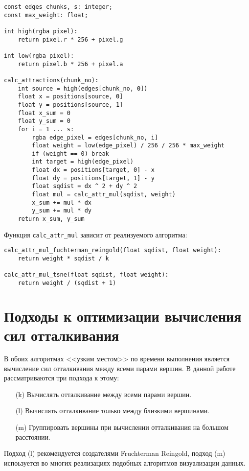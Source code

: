 \begin{verbatim}
const edges_chunks, s: integer;
const max_weight: float;

int high(rgba pixel):
    return pixel.r * 256 + pixel.g

int low(rgba pixel):
    return pixel.b * 256 + pixel.a

calc_attractions(chunk_no):
    int source = high(edges[chunk_no, 0])
    float x = positions[source, 0]
    float y = positions[source, 1]
    float x_sum = 0
    float y_sum = 0
    for i = 1 ... s:
        rgba edge_pixel = edges[chunk_no, i]
        float weight = low(edge_pixel) / 256 / 256 * max_weight
        if (weight == 0) break
        int target = high(edge_pixel)
        float dx = positions[target, 0] - x
        float dy = positions[target, 1] - y
        float sqdist = dx ^ 2 + dy ^ 2
        float mul = calc_attr_mul(sqdist, weight)
        x_sum += mul * dx
        y_sum += mul * dy
    return x_sum, y_sum
\end{verbatim}

Функция \texttt{calc\_attr\_mul} зависит от реализуемого алгоритма:

\begin{verbatim}
calc_attr_mul_fuchterman_reingold(float sqdist, float weight):
    return weight * sqdist / k

calc_attr_mul_tsne(float sqdist, float weight):
    return weight / (sqdist + 1)
\end{verbatim}

\section{Подходы к оптимизации вычисления сил отталкивания}


В обоих алгоритмах <<узким местом>> по времени выполнения является вычисление сил отталкивания между всеми парами вершин. В данной работе рассматриваются три подхода к этому:

\begin{itemize}
\item[(k)] Вычислять отталкивание между всеми парами вершин.
\item[(l)] Вычислять отталкивание только между близкими вершинами.
\item[(m)] Группировать вершины при вычислении отталкивания на большом расстоянии.
\end{itemize}

Подход (l) рекомендуется создателями Fruchterman Reingold, подход (m) испоьзуется во многих реализациях подобных алгоритмов визуализации данных.

